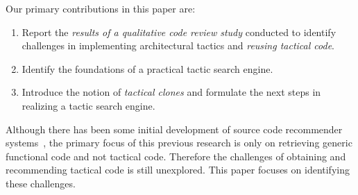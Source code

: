 







Our primary contributions in this paper are:

\begin{enumerate}
   \setlength{\itemsep}{0pt} %
   \setlength{\parskip}{0pt} %
   \setlength{\parsep}{0pt}  %

  \item Report the \textit{results of a qualitative code review study} conducted to identify challenges in implementing architectural tactics and \textit{reusing tactical code}.
  \item Identify the foundations of a practical tactic search engine.
  \item Introduce the notion of \textit{tactical clones} and formulate the next steps in realizing a tactic search engine.
\end{enumerate}



Although there has been some initial development of source code recommender systems~\cite{DBLP:conf/icse/McMillanHPCM12,6340250}, the primary focus of this previous research is only on retrieving generic functional code and not tactical code. Therefore the challenges of obtaining and recommending tactical code is still unexplored. This paper focuses on identifying these challenges.

